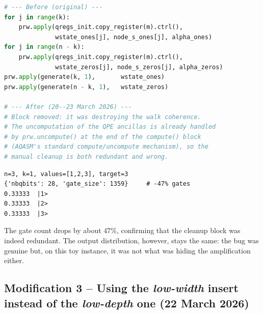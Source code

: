 \documentclass[11pt,a4paper]{article}
\begin{document}
\begin{lstlisting}[language=Python]
# --- Before (original) ---
for j in range(k):
    prw.apply(qregs_init.copy_register(m).ctrl(),
              wstate_ones[j], node_s_ones[j], alpha_ones)
for j in range(n - k):
    prw.apply(qregs_init.copy_register(m).ctrl(),
              wstate_zeros[j], node_s_zeros[j], alpha_zeros)
prw.apply(generate(k, 1),       wstate_ones)
prw.apply(generate(n - k, 1),   wstate_zeros)

# --- After (20--23 March 2026) ---
# Block removed: it was destroying the walk coherence.
# The uncomputation of the QPE ancillas is already handled
# by prw.uncompute() at the end of the compute() block
# (AQASM's standard compute/uncompute mechanism), so the
# manual cleanup is both redundant and wrong.
\end{lstlisting}

\begin{lstlisting}[style=plain]
n=3, k=1, values=[1,2,3], target=3
{'nbqbits': 28, 'gate_size': 1359}     # -47% gates
0.33333  |1>
0.33333  |2>
0.33333  |3>
\end{lstlisting}

The gate count drops by about 47\%, confirming that the cleanup block
was indeed redundant. The output distribution, however, stays the
same: the bug was genuine but, on this toy instance, it was not what
was hiding the amplification either.

\subsection*{Modification 3 -- Using the
\emph{low-width} insert instead of the \emph{low-depth} one
(22 March 2026)}
\end{document}
